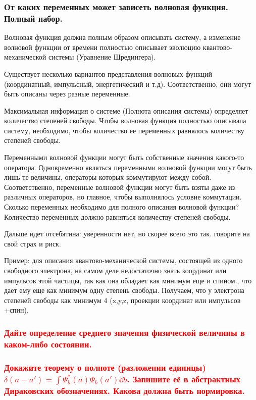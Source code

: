 \subsubsection{От каких переменных может зависеть волновая функция. Полный набор.}



Волновая функция должна полным образом описывать систему, а изменение волновой функции от времени полностью описывает эволюцию квантово-механической системы (Уравнение Шредингера). 

Существует несколько вариантов представления волновых функций (координатный, импульсный, энергетический и т.д). Соответственно, они могут быть описаны через разные переменные. 

Максимальная информация о системе (Полнота описания системы) определяет количество степеней свободы. Чтобы волновая функция полностью описывала систему, необходимо, чтобы количество ее переменных равнялось количеству степеней свободы. 

Переменными волновой функции могут быть собственные значения какого-то оператора. Одновременно являться переменными волновой функции могут быть лишь те величины, операторы которых коммутируют между собой. Соответственно, переменные волновой функции могут быть взяты даже из различных операторов, но главное, чтобы выполнялось условие коммутации. Сколько переменных необходимо для полного описания волновой функции? Количество переменных должно равняться количеству степеней свободы.

Дальше идет отсебятина: уверенности нет, но скорее всего это так. говорите на свой страх и риск. 

 Пример: для описания квантово-механической системы, состоящей из одного свободного электрона, на самом деле недостаточно знать координат или импульсов этой частицы, так как она обладает как минимум еще и спином., что дает ему еще как минимум одну степень свободы. Получаем, что у электрона степеней свободы как минимум 4 (x,y,z, проекции координат или импульсов +спин). 


\subsubsection{\textcolor{red} {Дайте определение среднего значения физической величины в каком-либо
состоянии.}}

\subsubsection{\textcolor{red} {Докажите теорему о полноте (разложении единицы)
$\delta(a-a')=\int\Psi_b^*(a)\Psi_b(a')\dd{b}$.
Запишите её в абстрактных Дираковских обозначениях. Какова должна быть
нормировка.} }